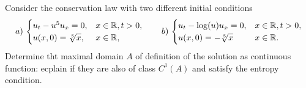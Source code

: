 \newpage
\begin{exercise}
    Consider the conservation law with two different initial conditions
    \begin{equation*}
        a)\,\begin{cases}
            u_t - u^5 u_x = 0, & x \in \mathbb{R}, t > 0, \\
            u(x,0) = \sqrt[5]{x}, & x \in \mathbb{R},
        \end{cases}
        \qquad 
        b)\,\begin{cases}
            u_t - \log(u) u_x = 0, & x \in \mathbb{R}, t > 0, \\
            u(x,0) = -\sqrt[5]{x} & x \in \mathbb{R}.
        \end{cases}
    \end{equation*}
    Determine tht maximal domain \(A\) of definition of the solution as continuous function: ecplain if they are also of class \(C^1(A)\) and satisfy the entropy condition.
\end{exercise}
